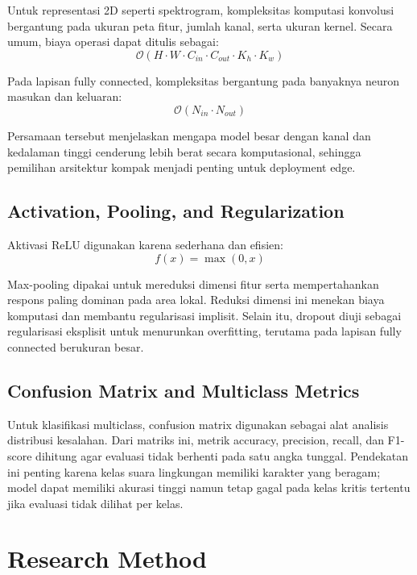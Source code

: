 \documentclass[10pt,a4paper]{jurnalvarian}
\let\LaTeXsection\section
\let\LaTeXsubsection\subsection
\def\section{\setlength{\leftskip}{0cm}\LaTeXsection}
\def\subsection{\setlength{\leftskip}{0.6cm}\LaTeXsubsection}
\begin{document}
Untuk representasi 2D seperti spektrogram, kompleksitas komputasi konvolusi bergantung pada ukuran peta fitur, jumlah kanal, serta ukuran kernel. Secara umum, biaya operasi dapat ditulis sebagai:
\begin{equation}
\mathcal{O}(H\cdot W\cdot C_{in}\cdot C_{out}\cdot K_h\cdot K_w)
\end{equation}

Pada lapisan fully connected, kompleksitas bergantung pada banyaknya neuron masukan dan keluaran:
\begin{equation}
\mathcal{O}(N_{in}\cdot N_{out})
\end{equation}

Persamaan tersebut menjelaskan mengapa model besar dengan kanal dan kedalaman tinggi cenderung lebih berat secara komputasional, sehingga pemilihan arsitektur kompak menjadi penting untuk deployment edge.

\subsection{Activation, Pooling, and Regularization}
Aktivasi ReLU digunakan karena sederhana dan efisien:
\begin{equation}
f(x)=\max(0,x)
\end{equation}

Max-pooling dipakai untuk mereduksi dimensi fitur serta mempertahankan respons paling dominan pada area lokal. Reduksi dimensi ini menekan biaya komputasi dan membantu regularisasi implisit. Selain itu, dropout diuji sebagai regularisasi eksplisit untuk menurunkan overfitting, terutama pada lapisan fully connected berukuran besar.

\subsection{Confusion Matrix and Multiclass Metrics}
Untuk klasifikasi multiclass, confusion matrix digunakan sebagai alat analisis distribusi kesalahan. Dari matriks ini, metrik accuracy, precision, recall, dan F1-score dihitung agar evaluasi tidak berhenti pada satu angka tunggal. Pendekatan ini penting karena kelas suara lingkungan memiliki karakter yang beragam; model dapat memiliki akurasi tinggi namun tetap gagal pada kelas kritis tertentu jika evaluasi tidak dilihat per kelas.


\section{Research Method}
\end{document}
